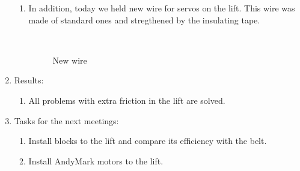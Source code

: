 \begin{enumerate}
\begin{enumerate}
	   \item In addition, today we held new wire for servos on the lift. This wire was made of standard ones and stregthened by the insulating tape.
	   \begin{figure}[H]
	   	\begin{minipage}[h]{0.2\linewidth}
	   		\center  
	   	\end{minipage}
	   	\begin{minipage}[h]{0.6\linewidth}
	   		\caption{New wire}
	   	\end{minipage}
	   \end{figure}

	\end{enumerate}
	
	\item Results:
	\begin{enumerate}
		
		\item All problems with extra friction in the lift are solved.
		
	\end{enumerate}
	
	\item Tasks for the next meetings:
	\begin{enumerate}
		
		\item Install blocks to the lift and compare its efficiency with the belt.
		
		\item Install AndyMark motors to the lift.
			
	\end{enumerate}
\end{enumerate}
\fillpage
